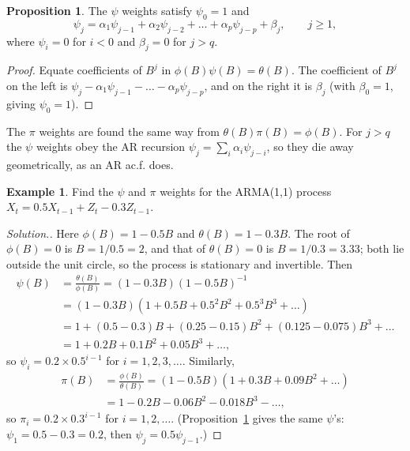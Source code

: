 \documentclass[11pt,a4paper]{article}
\theoremstyle{definition}
\newtheorem{exa}[thm]{Example}
\newtheorem{prop}[thm]{Proposition}
\newenvironment{solution}
  {\renewcommand{\qedsymbol}{}\begin{proof}[\textit{Solution}.]}
  {\end{proof}}
\begin{document}
\begin{prop}\label{prop:psi-recursion}
The $\psi$ weights satisfy $\psi_0 = 1$ and
\[
\psi_j = \alpha_1\psi_{j-1} + \alpha_2\psi_{j-2} + \dots + \alpha_p\psi_{j-p} + \beta_j , \qquad j \ge 1 ,
\]
where $\psi_i = 0$ for $i < 0$ and $\beta_j = 0$ for $j > q$.
\end{prop}

\begin{proof}
Equate coefficients of $B^j$ in $\phi(B)\psi(B) = \theta(B)$. The coefficient of $B^j$ on the left is $\psi_j - \alpha_1\psi_{j-1} - \dots - \alpha_p\psi_{j-p}$, and on the
right it is $\beta_j$ (with $\beta_0 = 1$, giving $\psi_0 = 1$).
\end{proof}

The $\pi$ weights are found the same way from $\theta(B)\pi(B) = \phi(B)$. For $j > q$ the $\psi$ weights obey the AR recursion
$\psi_j = \sum_i\alpha_i\psi_{j-i}$, so they die away geometrically, as an AR ac.f. does.

\begin{exa}\label{exa:arma11-weights}
Find the $\psi$ and $\pi$ weights for the ARMA(1,1) process $X_t = 0.5X_{t-1} + Z_t - 0.3Z_{t-1}$.
\end{exa}

\begin{solution}
Here $\phi(B) = 1 - 0.5B$ and $\theta(B) = 1 - 0.3B$. The root of $\phi(B) = 0$ is $B = 1/0.5 = 2$, and that of $\theta(B) = 0$ is $B = 1/0.3 = 3.33$; both lie
outside the unit circle, so the process is stationary and invertible. Then
\begin{align*}
\psi(B) &= \frac{\theta(B)}{\phi(B)} = (1 - 0.3B)(1 - 0.5B)^{-1} \\
&= (1 - 0.3B)(1 + 0.5B + 0.5^2B^2 + 0.5^3B^3 + \dots) \\
&= 1 + (0.5 - 0.3)B + (0.25 - 0.15)B^2 + (0.125 - 0.075)B^3 + \dots \\
&= 1 + 0.2B + 0.1B^2 + 0.05B^3 + \dots ,
\end{align*}
so $\psi_i = 0.2 \times 0.5^{i-1}$ for $i = 1, 2, 3, \dots$. Similarly,
\begin{align*}
\pi(B) &= \frac{\phi(B)}{\theta(B)} = (1 - 0.5B)(1 + 0.3B + 0.09B^2 + \dots) \\
&= 1 - 0.2B - 0.06B^2 - 0.018B^3 - \dots ,
\end{align*}
so $\pi_i = 0.2 \times 0.3^{i-1}$ for $i = 1, 2, \dots$. (Proposition~\ref{prop:psi-recursion} gives the same $\psi$'s: $\psi_1 = 0.5 - 0.3 = 0.2$, then $\psi_j = 0.5\psi_{j-1}$.)
\end{solution}
\end{document}

